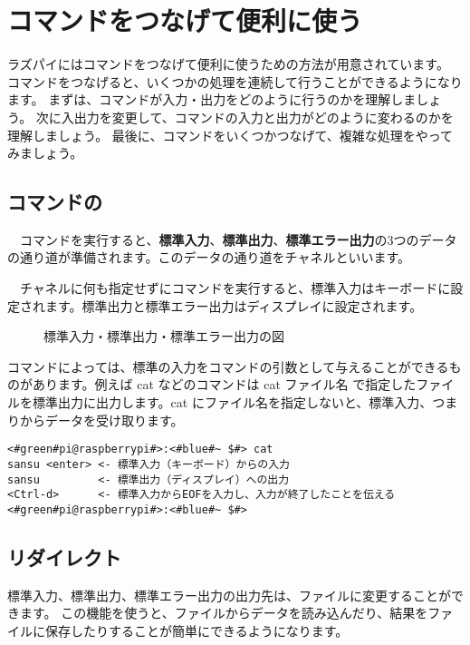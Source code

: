 \newpage
\section{コマンドをつなげて便利に使う}
ラズパイにはコマンドをつなげて便利に使うための方法が用意されています。
コマンドをつなげると、いくつかの処理を連続して行うことができるようになります。
まずは、コマンドが入力・出力をどのように行うのかを理解しましょう。
次に入出力を変更して、コマンドの入力と出力がどのように変わるのかを理解しましょう。
最後に、コマンドをいくつかつなげて、複雑な処理をやってみましょう。

\subsection{コマンドの}
　コマンドを実行すると、{\bf 標準入力}、{\bf 標準出力}、{\bf 標準エラー出力}の3つのデータの通り道が準備されます。このデータの通り道をチャネルといいます。

　チャネルに何も指定せずにコマンドを実行すると、標準入力はキーボードに設定されます。標準出力と標準エラー出力はディスプレイに設定されます。

\begin{figure}
    \centering
    
    \caption{標準入力・標準出力・標準エラー出力の図}
    \label{ch03:stdioerr}
\end{figure}

コマンドによっては、標準の入力をコマンドの引数として与えることができるものがあります。例えば cat などのコマンドは cat ファイル名 で指定したファイルを標準出力に出力します。cat にファイル名を指定しないと、標準入力、つまりからデータを受け取ります。

\begin{lstlisting}[caption=catの標準入力・標準出力, label=stdioCat]
<#green#pi@raspberrypi#>:<#blue#~ $#> cat 
sansu <enter> <- 標準入力（キーボード）からの入力
sansu         <- 標準出力（ディスプレイ）への出力
<Ctrl-d>      <- 標準入力からEOFを入力し、入力が終了したことを伝える
<#green#pi@raspberrypi#>:<#blue#~ $#>
\end{lstlisting}


\subsection{リダイレクト}
標準入力、標準出力、標準エラー出力の出力先は、ファイルに変更することができます。
この機能を使うと、ファイルからデータを読み込んだり、結果をファイルに保存したりすることが簡単にできるようになります。

